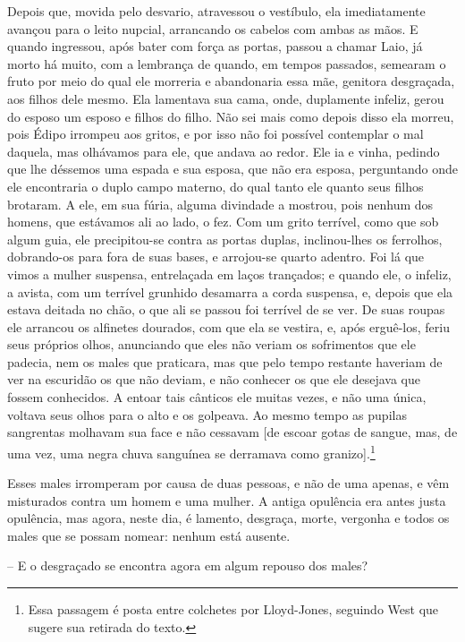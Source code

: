 Depois que, movida pelo desvario, atravessou o vestíbulo, ela
imediatamente avançou para o leito nupcial, arrancando os cabelos com
ambas as mãos. E quando ingressou, após bater com força as portas,
passou a chamar Laio, já morto há muito, com a lembrança de quando, em
tempos passados, semearam o fruto por meio do qual ele morreria e
abandonaria essa mãe, genitora desgraçada, aos filhos dele mesmo. 
Ela lamentava sua cama, onde, duplamente infeliz, gerou do esposo um
esposo e filhos do filho. Não sei mais como depois disso ela morreu,
pois Édipo irrompeu aos gritos, e por isso não foi possível contemplar o
mal daquela, mas olhávamos para ele, que andava ao redor. Ele ia e
vinha, pedindo que lhe déssemos uma espada e sua esposa, que não era
esposa, perguntando onde ele encontraria o duplo campo materno, do qual
tanto ele quanto seus filhos brotaram. A ele, em sua fúria, alguma
divindade a mostrou, pois nenhum dos homens, que estávamos ali ao lado,
o fez. Com um grito terrível, como  que sob algum guia, ele
precipitou-se contra as portas duplas, inclinou-lhes os ferrolhos,
dobrando-os para fora de suas bases, e arrojou-se quarto adentro. Foi lá
que vimos a mulher suspensa, entrelaçada em laços trançados; e quando
ele, o infeliz, a avista, com um terrível grunhido desamarra a corda
suspensa, e, depois que ela estava deitada no chão, o que ali se passou
foi terrível de se ver. De suas roupas ele arrancou os alfinetes
dourados, com que ela se vestira, e, após erguê-los, feriu seus próprios
olhos,  anunciando que eles não veriam os sofrimentos que ele
padecia, nem os males que praticara, mas que pelo tempo restante
haveriam de ver na escuridão os que não deviam, e não conhecer os que
ele desejava que fossem conhecidos. A entoar tais cânticos ele muitas
vezes, e não uma única, voltava seus olhos para o alto e os golpeava. Ao
mesmo tempo as pupilas sangrentas molhavam sua face e não cessavam {[}de
escoar gotas de sangue, mas, de uma vez, uma negra chuva sanguínea se
derramava como granizo{]}.\footnote{Essa passagem é posta entre colchetes
  por Lloyd-Jones, seguindo West que sugere sua retirada do texto.}

 Esses males irromperam por causa de duas pessoas, e não de uma
apenas, e vêm misturados contra um homem e uma mulher. A antiga
opulência era antes justa opulência, mas agora, neste dia, é lamento,
desgraça, morte, vergonha e todos os males que se possam nomear: nenhum
está ausente.

 --   E o desgraçado se encontra agora em algum repouso dos males?

